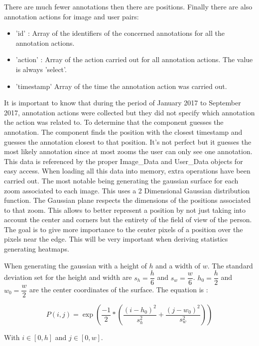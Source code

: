 \documentclass[a4paper,11pt]{report}
\numberwithin{figure}{section} %
\begin{document}
    There are much fewer annotations then there are positions.
    Finally there are also annotation actions for image and user pairs:
    \begin{itemize}
        \item[\textbullet] 'id' : Array of the identifiers of the concerned annotations for all the annotation actions.
        \item[\textbullet] 'action' : Array of the action carried out for all annotation actions.
        The value is always 'select'.
        \item[\textbullet] 'timestamp' Array of the time the annotation action was carried out.
    \end{itemize}
    It is important to know that during the period of January 2017 to September 2017, annotation actions were collected but they did not specify which annotation the action was related to.
    To determine that the component guesses the annotation.
    The component finds the position with the closest timestamp and guesses the annotation closest to that position.
    It's not perfect but it guesses the most likely annotation since at most zooms the user can only see one annotation.\\


    This data is referenced by the proper Image\_Data and User\_Data objects for easy access.
    When loading all this data into memory, extra operations have been carried out.
    The most notable being generating the gaussian surface for each zoom associated to each image.
    This uses a 2 Dimensional Gaussian distribution function.
    The Gaussian plane respects the dimensions of the positions associated to that zoom.
    This allows to better represent a position by not just taking into account the center and corners but the entirety of the field of view of the person.
    The goal is to give more importance to the center pixels of a position over the pixels near the edge.
    This will be very important when deriving statistics generating heatmaps.

    When generating the gaussian with a height of $h$ and a width of $w$.
    The standard deviation set for the height and width are $s_h = \dfrac{h}{6}$ and $s_w = \dfrac{w}{6}$.
    $h_0 = \dfrac{h}{2}$ and $w_0 = \dfrac{w}{2}$ are the center coordinates of the surface.
    The equation is :

        \[P(i,j) = \exp(\dfrac{-1}{2}*(\dfrac{(i - h_0)^2}{s_h^2} + \dfrac{(j - w_0)^2}{s_w^2}))\]

    With $i \in [0, h]$ and $j \in [0, w]$.
\end{document}
